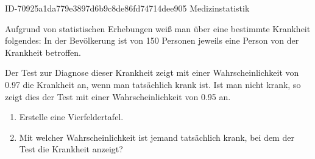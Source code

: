 \begin{exercise}
      {ID-70925a1da779e3897d6b9c8de86fd74714dee905}
      {Medizinstatistik}
  \ifproblem\problem\par
    Aufgrund von statistischen Erhebungen weiß man über eine bestimmte Krankheit
    folgendes: In der Bevölkerung ist von 150 Personen jeweils eine Person von
    der Krankheit betroffen.\par
    Der Test zur Diagnose dieser Krankheit zeigt mit einer Wahrscheinlichkeit von
    \num{0.97} die Krankheit an, wenn man tatsächlich krank ist. Ist man nicht
    krank, so zeigt dies der Test mit einer Wahrscheinlichkeit von \num{0.95} an.
    \begin{enumerate}
      \item Erstelle eine Vierfeldertafel.
      \item Mit welcher Wahrscheinlichkeit ist jemand tatsächlich krank,
            bei dem der Test die Krankheit anzeigt?
    \end{enumerate}
  \fi
\end{exercise}
